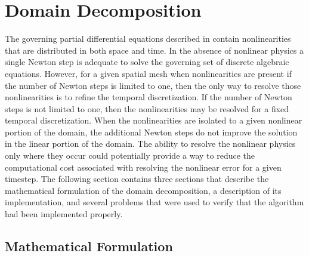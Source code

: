 \chapter{Domain Decomposition}
\label{chap:domain_decomposition}
The governing partial differential equations described in  contain nonlinearities that are distributed in both space and time.
In the absence of nonlinear physics a single Newton step is adequate to solve the governing set of discrete algebraic equations.
However, for a given spatial mesh when nonlinearities are present if the number of Newton steps is limited to one, then the only way to resolve those nonlinearities is to refine the temporal discretization.
If the number of Newton steps is not limited to one, then the nonlinearities may be resolved for a fixed temporal discretization.
When the nonlinearities are isolated to a given nonlinear portion of the domain, the additional Newton steps do not improve the solution in the linear portion of the domain.
The ability to resolve the nonlinear physics only where they occur could potentially provide a way to reduce the computational cost associated with resolving the nonlinear error for a given timestep.
The following section contains three sections that describe the mathematical formulation of the domain decomposition, a description of its implementation, and several problems that were used to verify that the algorithm had been implemented properly.

\section{Mathematical Formulation}
\label{sec:domDecompMath}

